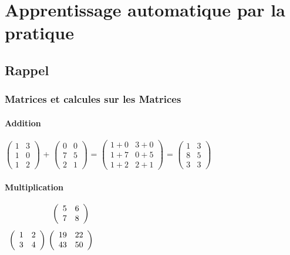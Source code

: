 \part{Apprentissage automatique par la pratique}
\pagebreak

\chapter{Rappel}\pagebreak
\section{Matrices et calcules sur les Matrices}

\subsection{Addition}

$\left(\begin{array}{cc}
1 & 3 \\ 1 & 0 \\ 1 & 2 \end{array} \right)$
+
$\left(\begin{array}{cc}
0 & 0 \\ 7 & 5 \\ 2 & 1 \end{array} \right) $
=
$\left(\begin{array}{cc}
1+0 & 3+0 \\ 1+7 & 0+5 \\ 1+2 & 2+1 \end{array} \right) $
=
$\left(\begin{array}{cc}
1 & 3 \\ 8 & 5 \\ 3 & 3 \end{array} \right) $

\subsection{Multiplication}

$\begin{array}{c@{\ }c}
&
\left(\begin{array}{cc}
5 & 6 \\ 7 & 8 \end{array} \right) \\[0.5cm]
\left(\begin{array}{cc}
1 & 2 \\ 3 & 4 \end{array} \right)
&
\left(\begin{array}{cc}
19 & 22 \\ 43 & 50 \end{array} \right)
\end{array}$

